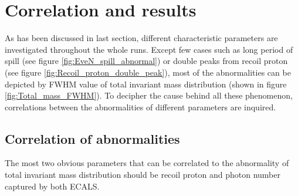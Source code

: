 \section{Correlation and results}
As has been discussed in last section, different characteristic parameters are investigated throughout the whole runs. Except few cases such as long period of spill (see figure \ref{fig:EveN_spill_abnormal}) or double peaks from recoil proton (see figure \ref{fig:Recoil_proton_double_peak}), most of the abnormalities can be depicted by FWHM value of total invariant mass distribution (shown in figure \ref{fig:Total_mass_FWHM}). To decipher the cause behind all these phenomenon, correlations between the abnormalities of different parameters are inquired.
\subsection{Correlation of abnormalities}
The most two obvious parameters that can be correlated to the abnormality of total invariant mass distribution should be recoil proton and photon number captured by both ECALS.
